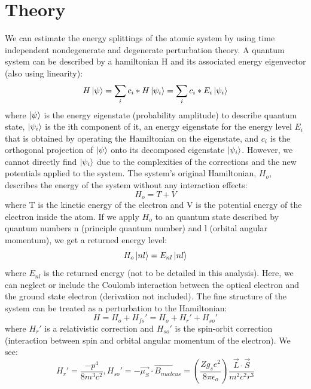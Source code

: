 \documentclass{article}
\begin{document}
    

\section{Theory}
    We can estimate the energy splittings of the atomic system by using time independent nondegenerate and degenerate perturbation theory. A quantum system can be described by a hamiltonian H and its associated energy eigenvector (also using linearity):
    \begin{equation}
        H \ket{\psi} = \sum_ic_i*H\ket{\psi_i} = \sum_ic_i*E_i\ket{\psi_i}
    \end{equation}
    where $\ket{\psi}$ is the energy eigenstate (probability amplitude) to describe quantum state, $\ket{\psi_i}$ is the ith component of it, an energy eigenstate for the energy level $E_i$ that is obtained by operating the Hamiltonian on the eigenstate, and $c_i$ is the orthogonal projection of $\ket{\psi}$ onto its decomposed eigenstate $\ket{\psi_i}$. However, we cannot directly find $\ket{\psi_i}$ due to the complexities of the corrections and the new potentials applied to the system. The system's original Hamiltonian, $H_o$, describes the energy of the system without any interaction effects:
    \begin{equation}
        H_o = T + V
    \end{equation}
    where T is the kinetic energy of the electron and V is the potential energy of the electron inside the atom. If we apply $H_o$ to an quantum state described by quantum numbers n (principle quantum number) and l (orbital angular momentum), we get a returned energy level:
    \begin{equation}
        H_o\ket{nl} = E_{nl}\ket{nl}
    \end{equation}
    where $E_{nl}$ is the returned energy (not to be detailed in this analysis).
    Here, we can neglect or include the Coulomb interaction between the optical electron and the ground state electron (derivation not included). The fine structure of the system can be treated as a perturbation to the Hamiltonian:
    \begin{equation}
        H = H_o + H_{fs}' = H_o + H_r' + H_{so}'
    \end{equation}
    where $H_r'$ is a relativistic correction and $H_{so}'$ is the spin-orbit correction (interaction between spin and orbital angular momentum of the electron). We see:
    \begin{equation}
        H_r' = \frac{-p^4}{8m^3c^2},H_{so}' = -\vec{\mu_{S}} \cdot \vec{B_{nucleus}} = (\frac{Zg_se^2}{8\pi\epsilon_o})\frac{\vec{L}\cdot\vec{S}}{m^2c^2r^3}
    \end{equation}%
\end{document}
